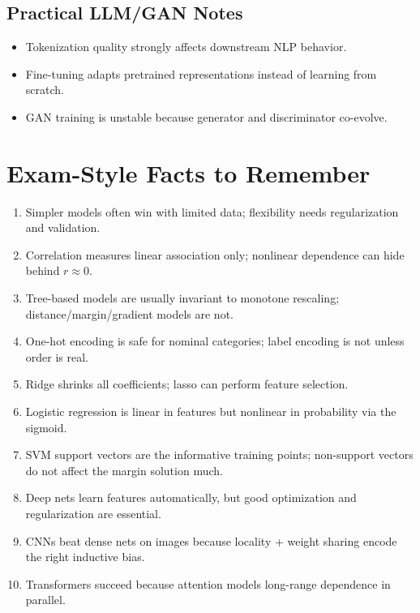 \documentclass[10pt,twocolumn]{article}
\begin{document}
\subsection{Practical LLM/GAN Notes}
\begin{itemize}
  \item Tokenization quality strongly affects downstream NLP behavior.
  \item Fine-tuning adapts pretrained representations instead of learning from scratch.
  \item GAN training is unstable because generator and discriminator co-evolve.
\end{itemize}

\section{Exam-Style Facts to Remember}
\begin{enumerate}
  \item Simpler models often win with limited data; flexibility needs regularization and validation.
  \item Correlation measures linear association only; nonlinear dependence can hide behind $r\approx 0$.
  \item Tree-based models are usually invariant to monotone rescaling; distance/margin/gradient models are not.
  \item One-hot encoding is safe for nominal categories; label encoding is not unless order is real.
  \item Ridge shrinks all coefficients; lasso can perform feature selection.
  \item Logistic regression is linear in features but nonlinear in probability via the sigmoid.
  \item SVM support vectors are the informative training points; non-support vectors do not affect the margin solution much.
  \item Deep nets learn features automatically, but good optimization and regularization are essential.
  \item CNNs beat dense nets on images because locality + weight sharing encode the right inductive bias.
  \item Transformers succeed because attention models long-range dependence in parallel.
\end{enumerate}
\end{document}
